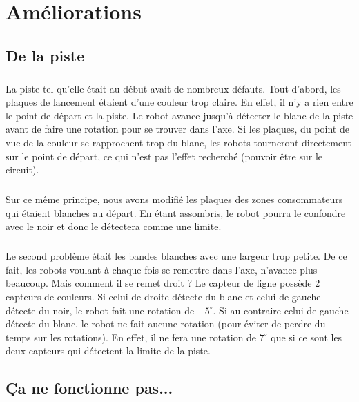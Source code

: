 \documentclass[12pt,oneside,a4paper]{book}
\begin{document}
\chapter{Améliorations}
\thispagestyle{fancy}

\section{De la piste}
	\paragraph{} La piste tel qu'elle était au début avait de nombreux défauts. Tout d'abord, les plaques de lancement étaient d'une couleur trop claire. En effet, il n'y a rien entre le point de départ et la piste. Le robot avance jusqu'à détecter le blanc de la piste avant de faire une rotation pour se trouver dans l'axe. Si les plaques, du point de vue de la couleur se rapprochent trop du blanc, les robots tourneront directement sur le point de départ, ce qui n'est pas l'effet recherché (pouvoir être sur le circuit).
	\paragraph{} Sur ce même principe, nous avons modifié les plaques des zones consommateurs qui étaient blanches au départ. En étant assombris, le robot pourra le confondre avec le noir et donc le détectera comme une limite.
	\paragraph{} Le second problème était les bandes blanches avec une largeur trop petite. De ce fait, les robots voulant à chaque fois se remettre dans l'axe, n'avance plus beaucoup. Mais comment il se remet droit ? Le capteur de ligne possède 2 capteurs de couleurs. Si celui de droite détecte du blanc et celui de gauche détecte du noir, le robot fait une rotation de $-5^\circ$. Si au contraire celui de gauche détecte du blanc, le robot ne fait aucune rotation (pour éviter de perdre du temps sur les rotations). En effet, il ne fera une rotation de $7^\circ$ que si ce sont les deux capteurs qui détectent la limite de la piste.

\section{Ça ne fonctionne pas...}
\end{document}
